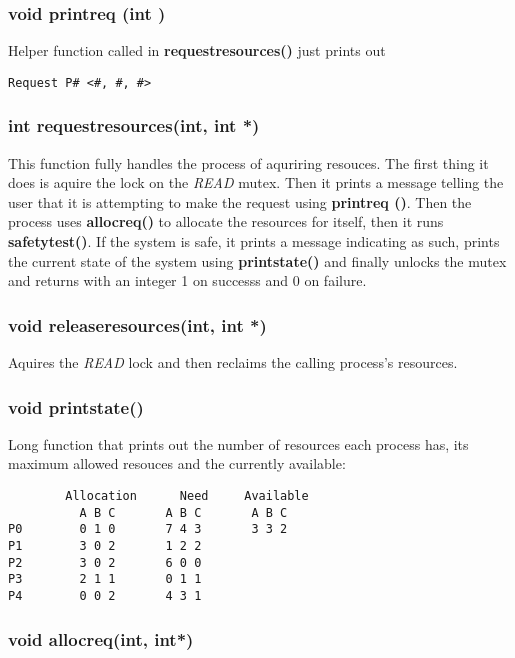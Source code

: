 \documentclass[11pt]{article}
\begin{document}
\subsubsection{ void print\textunderscore req (int )}
Helper function called in \textbf{request\textunderscore resources()} just prints out 
 \begin{verbatim}
Request P# <#, #, #>
\end{verbatim}

\subsubsection{int request\textunderscore resources(int, int *)}

This function fully handles the process of aquriring resouces. The first thing it does is aquire the lock on the \textit{READ} mutex. Then it prints a message telling the user that it is attempting to make the request using \textbf{print\textunderscore req ()}. Then the process uses \textbf{alloc\textunderscore req()} to allocate the resources for itself, then it runs \textbf{safety\textunderscore test()}. If the system is safe, it prints a message indicating as such, prints the current state of the system using \textbf{print\textunderscore state()} and finally unlocks the mutex and returns with an integer 1 on successs and 0 on failure.

\subsubsection{ void release\textunderscore resources(int, int *)}
Aquires the \textit{READ} lock and then reclaims the calling process's resources.

\subsubsection{ void print\textunderscore state()}
Long function that prints out the number of resources each process has, its maximum allowed resouces and the currently available:

\begin{verbatim}
        Allocation      Need     Available    
          A B C       A B C       A B C 
P0        0 1 0       7 4 3       3 3 2 
P1        3 0 2       1 2 2 
P2        3 0 2       6 0 0 
P3        2 1 1       0 1 1 
P4        0 0 2       4 3 1

\end{verbatim}

\subsubsection{ void alloc\textunderscore req(int, int*)}
\end{document}
